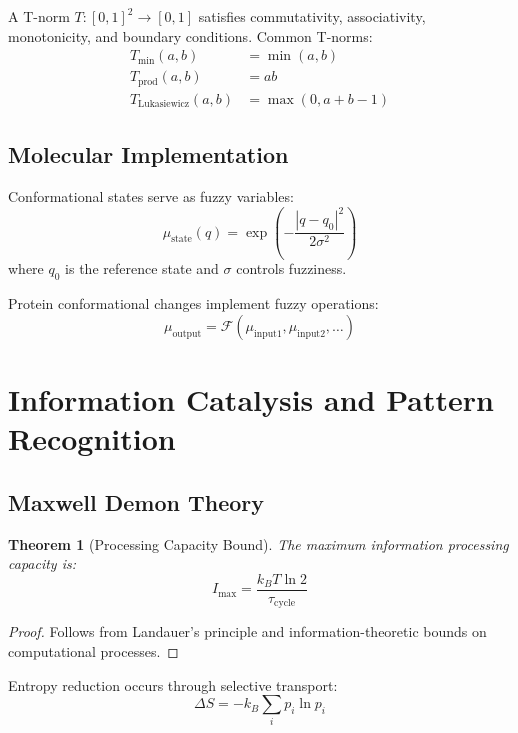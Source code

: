 \documentclass[12pt]{article}
\newtheorem{theorem}{Theorem}[section]
\begin{document}
A T-norm $T: [0,1]^2 \rightarrow [0,1]$ satisfies commutativity, associativity, monotonicity, and boundary conditions. Common T-norms:
\begin{align}
T_{\min}(a,b) &= \min(a,b) \\
T_{\text{prod}}(a,b) &= ab \\
T_{\text{Lukasiewicz}}(a,b) &= \max(0, a+b-1)
\end{align}

\subsection{Molecular Implementation}

Conformational states serve as fuzzy variables:
\begin{equation}
\mu_{\text{state}}(q) = \exp\left(-\frac{|q - q_0|^2}{2\sigma^2}\right)
\end{equation}
where $q_0$ is the reference state and $\sigma$ controls fuzziness.

Protein conformational changes implement fuzzy operations:
\begin{equation}
\mu_{\text{output}} = \mathcal{F}(\mu_{\text{input1}}, \mu_{\text{input2}}, \ldots)
\end{equation}

\section{Information Catalysis and Pattern Recognition}

\subsection{Maxwell Demon Theory}

\begin{theorem}[Processing Capacity Bound]
The maximum information processing capacity is:
\begin{equation}
I_{\max} = \frac{k_B T \ln 2}{\tau_{\text{cycle}}}
\end{equation}
\end{theorem}

\begin{proof}
Follows from Landauer's principle and information-theoretic bounds on computational processes.
\end{proof}

Entropy reduction occurs through selective transport:
\begin{equation}
\Delta S = -k_B \sum_i p_i \ln p_i
\end{equation}
\end{document}
